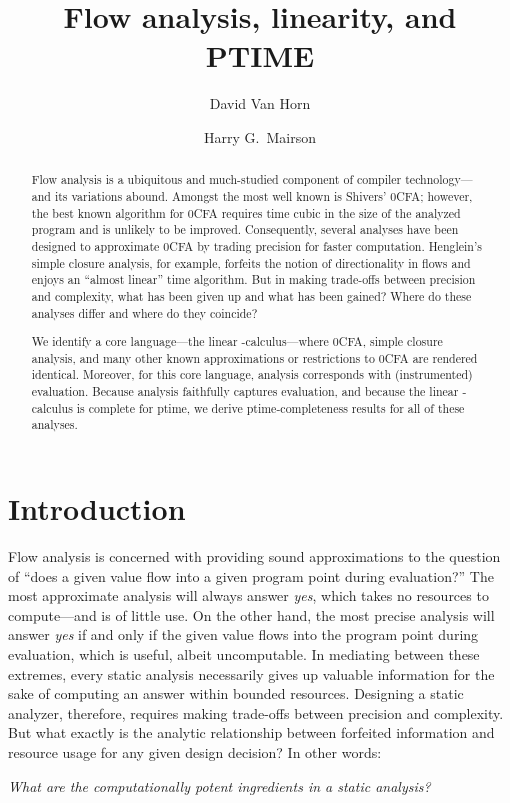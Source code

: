 \documentclass{llncs}
\title{Flow analysis, linearity, and PTIME}
\author{David {Van Horn} \and Harry G.~Mairson}
\institute{
Department of Computer Science\\
Brandeis University\\
Waltham, Massachusetts 02454\\
\email{\{dvanhorn,mairson\}@cs.brandeis.edu}
}
\newcommand\ptime{{\sc ptime}}
\begin{document}
\mainmatter
\maketitle

\begin{abstract}

Flow analysis is a ubiquitous and much-studied component of compiler
technology---and its variations abound.  Amongst the most well known is
Shivers' 0CFA; however, the best known algorithm for 0CFA requires
time cubic in the size of the analyzed program and is unlikely to be
improved.  Consequently, several analyses have been designed to
approximate 0CFA by trading precision for faster computation.
Henglein's simple closure analysis, for example, forfeits the notion
of directionality in flows and enjoys an ``almost linear'' time
algorithm.  But in making trade-offs between precision and complexity,
what has been given up and what has been gained?  Where do these
analyses differ and where do they coincide?

We identify a core language---the linear -calculus---where
0CFA, simple closure analysis, and many other known approximations or
restrictions to 0CFA are rendered identical.  Moreover, for this core
language, analysis corresponds with (instrumented) evaluation.
Because analysis faithfully captures evaluation, and because the
linear -calculus is complete for \ptime, we derive
\ptime-completeness results for all of these analyses.
\end{abstract}






\section{Introduction}
\label{sec:intro}


Flow analysis \cite{jones-81,sestoft-88,shivers-phd,midtgaard-07} is
concerned with providing sound approximations to the question of
``does a given value flow into a given program point during
evaluation?''  The most approximate analysis will always answer {\em
yes}, which takes no resources to compute---and is of little use.  On
the other hand, the most precise analysis will answer {\em yes} if and
only if the given value flows into the program point during
evaluation, which is useful, albeit uncomputable.  In mediating
between these extremes, every static analysis necessarily gives up
valuable information for the sake of computing an answer within
bounded resources.  Designing a static analyzer, therefore, requires
making trade-offs between precision and complexity. But what exactly
is the analytic relationship between forfeited information and
resource usage for any given design decision?  In other words:
\begin{center}
{\em What are the computationally potent ingredients in a
static analysis?}
\end{center}
\end{document}
